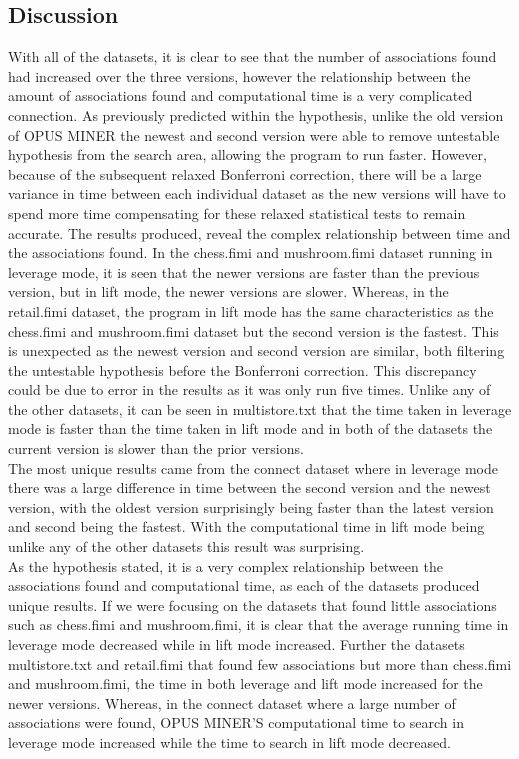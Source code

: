 \documentclass[10pt,a4paper]{article}
\begin{document}
\subsection{Discussion}
With all of the datasets, it is clear to see that the number of associations found had increased over the three versions, however the relationship between the amount of associations found and computational time is a very complicated connection. As previously predicted within the hypothesis, unlike the old version of OPUS MINER the newest and second version were able to remove untestable hypothesis from the search area, allowing the program to run faster. However, because of the subsequent relaxed Bonferroni correction, there will be a large variance in time between each individual dataset as the new versions will have to spend more time compensating for these relaxed statistical tests to remain accurate. The results produced, reveal the complex relationship between time and the associations found. In the chess.fimi and mushroom.fimi dataset running in leverage mode, it is seen that the newer versions are faster than the previous version, but in lift mode, the newer versions are slower. Whereas, in the retail.fimi dataset, the program in lift mode has the same characteristics as the chess.fimi and mushroom.fimi dataset but the second version is the fastest. This is unexpected as the newest version and second version are similar, both filtering the untestable hypothesis before the Bonferroni correction. This discrepancy could be due to error in the results as it was only run five times. Unlike any of the other datasets, it can be seen in multistore.txt that the time taken in leverage mode is faster than the time taken in lift mode and in both of the datasets the current version is slower than the prior versions.\\
The most unique results came from the connect dataset where in leverage mode there was a large difference in time between the second version and the newest version, with the oldest version surprisingly being faster than the latest version and second being the fastest. With the computational time in lift mode being unlike any of the other datasets this result was surprising.\\
 As the hypothesis stated, it is a very complex relationship between the associations found and computational time, as each of the datasets produced unique results. If we were focusing on the datasets that found little associations such as chess.fimi and mushroom.fimi, it is clear that the average running time in leverage mode decreased while in lift mode increased. Further the datasets multistore.txt and retail.fimi that found few associations but more than chess.fimi and mushroom.fimi, the time in both leverage and lift mode increased for the newer versions. Whereas, in the connect dataset where a large number of associations were found, OPUS MINER'S computational time to search in leverage mode increased while the time to search in lift mode decreased.\\
\end{document}
